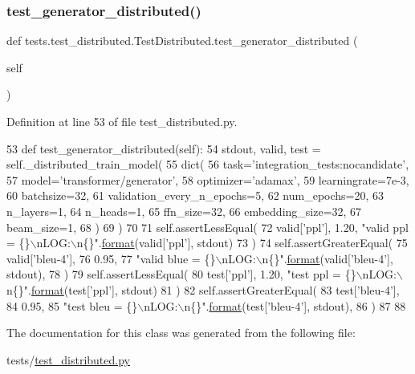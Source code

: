 \subsubsection{\texorpdfstring{test\+\_\+generator\+\_\+distributed()}{test\_generator\_distributed()}}
{\footnotesize\ttfamily def tests.\+test\+\_\+distributed.\+Test\+Distributed.\+test\+\_\+generator\+\_\+distributed (\begin{DoxyParamCaption}\item[{}]{self }\end{DoxyParamCaption})}



Definition at line 53 of file test\+\_\+distributed.\+py.


\begin{DoxyCode}
53     \textcolor{keyword}{def }test\_generator\_distributed(self):
54         stdout, valid, test = self.\_distributed\_train\_model(
55             dict(
56                 task=\textcolor{stringliteral}{'integration\_tests:nocandidate'},
57                 model=\textcolor{stringliteral}{'transformer/generator'},
58                 optimizer=\textcolor{stringliteral}{'adamax'},
59                 learningrate=7e-3,
60                 batchsize=32,
61                 validation\_every\_n\_epochs=5,
62                 num\_epochs=20,
63                 n\_layers=1,
64                 n\_heads=1,
65                 ffn\_size=32,
66                 embedding\_size=32,
67                 beam\_size=1,
68             )
69         )
70 
71         self.assertLessEqual(
72             valid[\textcolor{stringliteral}{'ppl'}], 1.20, \textcolor{stringliteral}{"valid ppl = \{\}\(\backslash\)nLOG:\(\backslash\)n\{\}"}.\hyperlink{namespaceparlai_1_1chat__service_1_1services_1_1messenger_1_1shared__utils_a32e2e2022b824fbaf80c747160b52a76}{format}(valid[\textcolor{stringliteral}{'ppl'}], stdout)
73         )
74         self.assertGreaterEqual(
75             valid[\textcolor{stringliteral}{'bleu-4'}],
76             0.95,
77             \textcolor{stringliteral}{"valid blue = \{\}\(\backslash\)nLOG:\(\backslash\)n\{\}"}.\hyperlink{namespaceparlai_1_1chat__service_1_1services_1_1messenger_1_1shared__utils_a32e2e2022b824fbaf80c747160b52a76}{format}(valid[\textcolor{stringliteral}{'bleu-4'}], stdout),
78         )
79         self.assertLessEqual(
80             test[\textcolor{stringliteral}{'ppl'}], 1.20, \textcolor{stringliteral}{"test ppl = \{\}\(\backslash\)nLOG:\(\backslash\)n\{\}"}.\hyperlink{namespaceparlai_1_1chat__service_1_1services_1_1messenger_1_1shared__utils_a32e2e2022b824fbaf80c747160b52a76}{format}(test[\textcolor{stringliteral}{'ppl'}], stdout)
81         )
82         self.assertGreaterEqual(
83             test[\textcolor{stringliteral}{'bleu-4'}],
84             0.95,
85             \textcolor{stringliteral}{"test bleu = \{\}\(\backslash\)nLOG:\(\backslash\)n\{\}"}.\hyperlink{namespaceparlai_1_1chat__service_1_1services_1_1messenger_1_1shared__utils_a32e2e2022b824fbaf80c747160b52a76}{format}(test[\textcolor{stringliteral}{'bleu-4'}], stdout),
86         )
87 
88 
\end{DoxyCode}


The documentation for this class was generated from the following file\+:\begin{DoxyCompactItemize}
\item 
tests/\hyperlink{test__distributed_8py}{test\+\_\+distributed.\+py}\end{DoxyCompactItemize}
